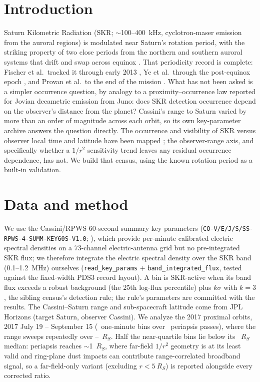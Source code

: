 \documentclass[twocolumn]{aastex631}
\newcommand{\code}[1]{\texttt{#1}}
\begin{document}

\section{Introduction}
Saturn Kilometric Radiation (SKR; $\sim$100--400~kHz, cyclotron-maser emission from the auroral
regions) is modulated near Saturn's rotation period, with the striking property of two close
periods from the northern and southern auroral systems that drift and swap across equinox
\citep{gurnett2009,fischer2015}. That periodicity record is complete: Fischer et al.\ tracked it
through early 2013 \citep{fischer2015}, Ye et al.\ through the post-equinox epoch
\citep{ye2016}, and Provan et al.\ to the end of the mission \citep{provan2019}. What has not been asked is a simpler
occurrence question, by analogy to a proximity--occurrence law reported for Jovian decametric
emission from Juno: does SKR detection occurrence depend on the observer's distance from
the planet? Cassini's range to Saturn varied by more than an order of magnitude across each orbit,
so its own key-parameter archive answers the question directly. The occurrence and visibility of
SKR versus observer local time and latitude have been mapped \citep{lamy2008}; the
observer-range axis, and specifically whether a $1/r^2$ sensitivity trend leaves any
residual occurrence dependence, has not. We build that census, using the known rotation period as
a built-in validation.

\section{Data and method}
\label{sec:method}
We use the Cassini/RPWS 60-second summary key parameters
(\code{CO-V/E/J/S/SS-RPWS-4-SUMM-KEY60S-V1.0}; \citealt{rpws_key60s}), which provide per-minute
calibrated electric spectral densities on a 73-channel electric-antenna grid but no
pre-integrated SKR flux; we therefore integrate the electric spectral density over the SKR band
(0.1--1.2~MHz) ourselves (\code{read\_key\_params} $+$ \code{band\_integrated\_flux}, tested
against the fixed-width PDS3 record layout). A bin is SKR-active when its band flux exceeds a
robust background (the 25th log-flux percentile) plus $k\sigma$ with $k=3$, the sibling census's
detection rule; the rule's parameters are committed with the results. The Cassini--Saturn range
and sub-spacecraft latitude come from JPL Horizons (target Saturn, observer Cassini). We analyze
the 2017 proximal orbits, 2017 July 19 -- September 15 (\skrNBins\ one-minute bins over
\skrRealNOrbits\ periapsis passes), where the range sweeps repeatedly over
\skrRealRangeMin--\skrRealRangeMax~$R_S$. Half the near-quartile bins lie below its
\skrRealRangeNear~$R_S$ median: periapsis reaches $\sim$1~$R_S$, where far-field $1/r^2$
geometry is at its least valid and ring-plane dust impacts can contribute range-correlated
broadband signal, so a far-field-only variant (excluding $r<5~R_S$) is reported alongside every
corrected ratio.
\end{document}
